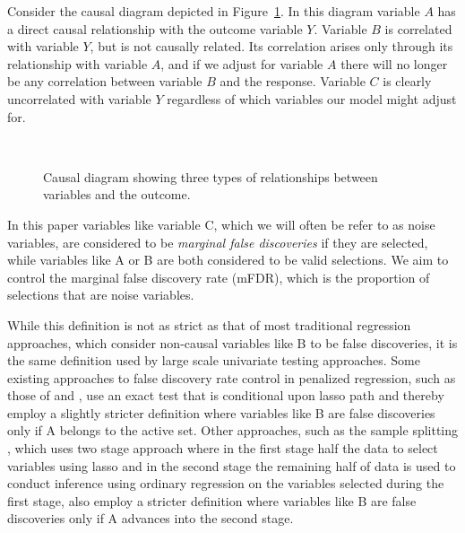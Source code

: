 Consider the causal diagram depicted in Figure~\ref{Fig:diagram}.  In this diagram variable $A$ has a direct causal relationship with the outcome variable $Y$.  Variable $B$ is correlated with variable $Y$, but is not causally related.  Its correlation arises only through its relationship with variable $A$, and if we adjust for variable $A$ there will no longer be any correlation between variable $B$ and the response.  Variable $C$ is clearly uncorrelated with variable $Y$ regardless of which variables our model might adjust for.

\begin{figure}[!htb]
\centering
{} \\
\caption{\label{Fig:diagram} Causal diagram showing three types of relationships between variables and the outcome.}
\end{figure}

In this paper variables like variable C, which we will often be refer to as noise variables, are considered to be \textit{marginal false discoveries} if they are selected, while variables like A or B are both considered to be valid selections. We aim to control the marginal false discovery rate (mFDR), which is the proportion of selections that are noise variables.

While this definition is not as strict as that of most traditional regression approaches, which consider non-causal variables like B to be false discoveries, it is the same definition used by large scale univariate testing approaches.  Some existing approaches to false discovery rate control in penalized regression, such as those of \citet{CovTest} and \citet{Selective_Inference}, use an exact test that is conditional upon lasso path and thereby employ a slightly stricter definition where variables like B are false discoveries only if A belongs to the active set.  Other approaches, such as the sample splitting \citep{Sample_Splitting}, which uses two stage approach where in the first stage half the data to select variables using lasso and in the second stage the remaining half of data is used to conduct inference using ordinary regression on the variables selected during the first stage, also employ a stricter definition where variables like B are false discoveries only if A advances into the second stage.

